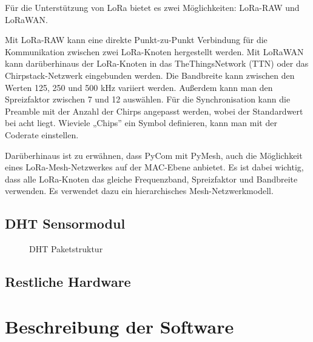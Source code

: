 Für die Unterstützung von LoRa bietet es zwei Möglichkeiten: LoRa-RAW und LoRaWAN. 

Mit LoRa-RAW kann eine direkte Punkt-zu-Punkt Verbindung für die Kommunikation zwischen zwei LoRa-Knoten hergestellt werden. Mit LoRaWAN kann darüberhinaus der LoRa-Knoten in das TheThingsNetwork (TTN) oder das Chirpstack-Netzwerk eingebunden werden. Die Bandbreite kann zwischen den Werten 125, 250 und 500 kHz variiert werden. Außerdem kann man den Spreizfaktor zwischen 7 und 12 auswählen. Für die Synchronisation kann die Preamble mit der Anzahl der Chirps angepasst werden, wobei der Standardwert bei acht liegt. Wieviele „Chips” ein Symbol definieren, kann man mit der Coderate einstellen.

Darüberhinaus ist zu erwähnen, dass PyCom mit PyMesh, auch die Möglichkeit eines LoRa-Mesh-Netzwerkes auf der MAC-Ebene anbietet. Es ist dabei wichtig, dass alle LoRa-Knoten das gleiche Frequenzband, Spreizfaktor und Bandbreite verwenden. Es verwendet dazu ein hierarchisches Mesh-Netzwerkmodell.


\subsection{DHT Sensormodul} \label{DHT}

\begin{center}
	\begin{figure}[h]
	 
	 \noindent{}
	 \caption[DHT Paketstruktur]{DHT Paketstruktur}
	 \label{fig:zeitplanung}
	\end{figure}
\end{center}



\subsection{Restliche Hardware} \label{Restliche Hardware}




\section{Beschreibung der Software} \label{Software}

